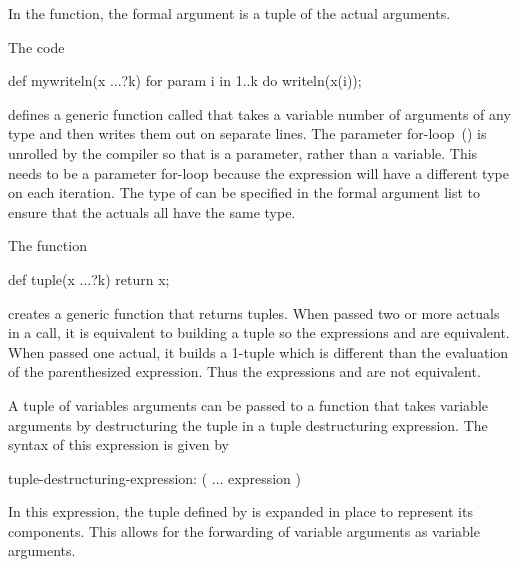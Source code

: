 In the function, the formal argument is a tuple of the actual
arguments.

\begin{example}
The code
\begin{chapel}
def mywriteln(x ...?k) {
  for param i in 1..k do
    writeln(x(i));
}
\end{chapel}
defines a generic function called  that takes a
variable number of arguments of any type and then writes them out on
separate lines.  The parameter for-loop~()
is unrolled by the compiler so that  is a parameter, rather
than a variable.  This needs to be a parameter for-loop because the
expression  will have a different type on each iteration.
The type of  can be specified in the formal argument list to
ensure that the actuals all have the same type.
\end{example}

\begin{example}
The function
\begin{chapel}
def tuple(x ...?k) return x;
\end{chapel}
creates a generic function that returns tuples.  When passed two or
more actuals in a call, it is equivalent to building a tuple so the
expressions  and  are equivalent.  When
passed one actual, it builds a 1-tuple which is different than the
evaluation of the parenthesized expression.  Thus the
expressions  and  are not equivalent.
\end{example}

A tuple of variables arguments can be passed to a function that takes
variable arguments by destructuring the tuple in a tuple destructuring
expression.  The syntax of this expression is given by
\begin{syntax}
tuple-destructuring-expression:
  ( ... expression )
\end{syntax}
In this expression, the tuple defined by  is expanded
in place to represent its components.  This allows for the forwarding
of variable arguments as variable arguments.
